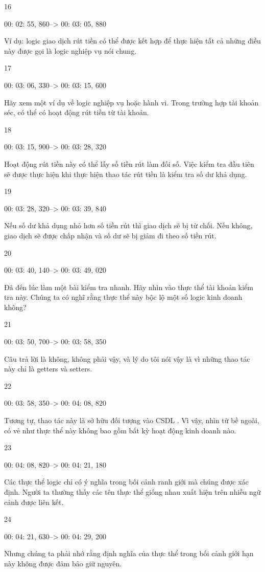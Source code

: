 16

00: 02: 55, 860--> 00: 03: 05, 880

Ví dụ: logic giao dịch rút tiền có thể được kết hợp để thực hiện tất cả những điều này được gọi là logic nghiệp vụ nói chung.

17

00: 03: 06, 330--> 00: 03: 15, 600

Hãy xem một ví dụ về logic nghiệp vụ hoặc hành vi. Trong trường hợp tài khoản séc, có thể có hoạt động rút tiền từ tài khoản.

18

00: 03: 15, 900--> 00: 03: 28, 320

Hoạt động rút tiền này có thể lấy số tiền rút làm đối số. Việc kiểm tra đầu tiên sẽ được thực hiện khi thực hiện thao tác rút tiền là kiểm tra số dư khả dụng.

19

00: 03: 28, 320--> 00: 03: 39, 840

Nếu số dư khả dụng nhỏ hơn số tiền rút thì giao dịch sẽ bị từ chối. Nếu không, giao dịch sẽ được chấp nhận và số dư sẽ bị giảm đi theo số tiền rút.

20

00: 03: 40, 140--> 00: 03: 49, 020

Đã đến lúc làm một bài kiểm tra nhanh. Hãy nhìn vào thực thể tài khoản kiểm tra này. Chúng ta có nghĩ rằng thực thể này bộc lộ một số logic kinh doanh không?

21

00: 03: 50, 700--> 00: 03: 58, 350

Câu trả lời là không, không phải vậy, và lý do tôi nói vậy là vì những thao tác này chỉ là getters và setters.

22

00: 03: 58, 350--> 00: 04: 08, 820

Tương tự, thao tác này là sở hữu đối tượng vào CSDL . Vì vậy, nhìn từ bề ngoài, có vẻ như thực thể này không bao gồm bất kỳ hoạt động kinh doanh nào.

23

00: 04: 08, 820--> 00: 04: 21, 180

Các thực thể logic chỉ có ý nghĩa trong bối cảnh ranh giới mà chúng được xác định. Người ta thường thấy các tên thực thể giống nhau xuất hiện trên nhiều ngữ cảnh được liên kết.

24

00: 04: 21, 630--> 00: 04: 29, 200

Nhưng chúng ta phải nhớ rằng định nghĩa của thực thể trong bối cảnh giới hạn này không được đảm bảo giữ nguyên.

